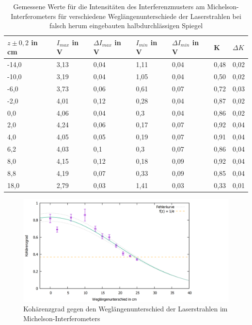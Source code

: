 \documentclass[12pt,a4paper]{article}
\begin{document}
\begin{table}[h!]
	\centering
	\begin{tabular}{|l|l|l|l|l|l|l|}\hline
		$z \pm 0,2$ in cm & $I_{max}$ in V & $\Delta I_{max}$ in V & $I_{min}$ in V & $\Delta I_{min}$ in V & K & $\Delta K$\\\hline
		-14,0&	3,13&	0,04&	1,11&	0,04&	0,48&	0,02\\
		-10,0&	3,19&	0,04&	1,05&	0,04&	0,50&	0,02\\
		-6,0&	3,73&	0,06&	0,61&	0,07&	0,72&	0,03\\
		-2,0&	4,01&	0,12&	0,28&	0,04&	0,87&	0,02\\
		0,0&	4,06&	0,04&	0,3&	0,04&	0,86&	0,02\\
		2,0&	4,24&	0,06&	0,17&	0,07&	0,92&	0,04\\
		4,0&	4,05&	0,05&	0,19&	0,07&	0,91&	0,04\\
		6,2&	4,03&	0,1&	0,3&	0,07&	0,86&	0,04\\
		8,0&	4,15&	0,12&	0,18&	0,09&	0,92&	0,04\\
		8,8&	4,19&	0,07&	0,33&	0,09&	0,85&	0,04\\
		18,0&	2,79&	0,03&	1,41&	0,03&	0,33&	0,01\\
		
		\hline
	\end{tabular}
	\caption{Gemessene Werte für die Intensitäten des Interferenzmusters am Michelson-Interferometers für verschiedene Weglängenunterschiede der Laserstrahlen bei falsch herum eingebauten halbdurchlässigen Spiegel }
	\label{ko2}
\end{table}

\begin{figure}[h]
	\centering
	\includegraphics[scale = 0.3]{koplot.png}
	\caption{Kohärenzgrad gegen den Weglängenunterschied der Laserstrahlen im Michelson-Interferometers}
	\label{kopl1}
\end{figure}
\end{document}
